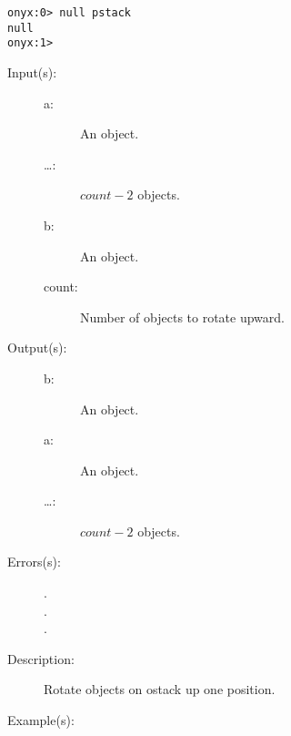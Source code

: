\begin{description}
\begin{description}
\begin{verbatim}
onyx:0> null pstack
null
onyx:1>
		\end{verbatim}
	\end{description}
\label{systemdict:nup}
\item[{\onyxop{a \dots b count}{nup}{b a \dots}}: ]
	\begin{description}\item[]
	\item[Input(s): ]
		\begin{description}\item[]
		\item[a: ]
			An object.
		\item[\dots: ]
			$count - 2$ objects.
		\item[b: ]
			An object.
		\item[count: ]
			Number of objects to rotate upward.
		\end{description}
	\item[Output(s): ]
		\begin{description}\item[]
		\item[b: ]
			An object.
		\item[a: ]
			An object.
		\item[\dots: ]
			$count - 2$ objects.
		\end{description}
	\item[Errors(s): ]
		\begin{description}\item[]
		\item[.]
		\item[.]
		\item[.]
		\end{description}
	\item[Description: ]
		Rotate  objects on ostack up one position.
	\item[Example(s): ]\begin{verbatim}


\end{verbatim}
\end{description}
\end{description}
